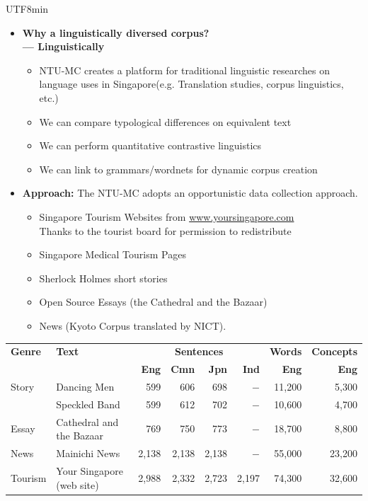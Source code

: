 \documentclass[25pt,landscape,headrule,footrule,dvips]{foils}
\newcommand{\emp}[1]{\textcolor{red}{#1}}
\newcommand{\myslide}[1]{\foilhead[-25mm]{\raisebox{12mm}[0mm]{\emp{#1}}}}
\begin{document}
\begin{CJK}{UTF8}{min}
\myslide{Motivation for NTU-MC}
\begin{itemize}\addtolength{\itemsep}{-0.8ex}
\item \textbf{Why a linguistically diversed corpus? \\--- Linguistically}
	\begin{itemize}
	\item NTU-MC creates a
          platform for traditional linguistic researches on language
          uses in Singapore(e.g. Translation studies, corpus
          linguistics, etc.)
        \item We can compare typological differences on equivalent text
        \item We can perform quantitative contrastive linguistics
        \item We can link to grammars/wordnets for dynamic corpus creation
	\end{itemize}
\end{itemize}

\myslide{Corpus Construction}
\begin{itemize}\addtolength{\itemsep}{-0.8ex}
\item \textbf{Approach:} The NTU-MC adopts an opportunistic data collection approach.
  \begin{itemize}
  \item Singapore Tourism Websites from \url{www.yoursingapore.com}
    \\ Thanks to the tourist board for permission to redistribute
  \item Singapore Medical Tourism Pages
  \item Sherlock Holmes short stories
  \item Open Source Essays (the Cathedral and the Bazaar)
  \item News (Kyoto Corpus translated by NICT).
  \end{itemize}
\end{itemize}

\myslide{NTU Multilingual Corpus}

{\footnotesize
\hspace{-15mm}
\begin{tabular}{llrrrrrr}\addtolength{\columnsep}{-1ex}
\textbf{Genre} &
\textbf{Text} &
\multicolumn{4}{c}{\textbf{Sentences}} 
& \textbf{Words} & \textbf{Concepts} \\
&& \textbf{Eng} &
\textbf{Cmn} &
\textbf{Jpn} &
\textbf{Ind} &
\textbf{Eng} &
\textbf{Eng} \\
\hline
Story &
Dancing Men &
599 &
606 &
698 &
$-$ &
11,200 & 
5,300 \\
~
 &
Speckled Band &
599 &
612 &
702 & 
$-$ &
10,600 &
4,700
\\
Essay &
Cathedral and the Bazaar &
769 &
750 &
773 &
$-$ & 
18,700 & 
8,800\\
News &
Mainichi News&
2,138 &
2,138 &
2,138 &
$-$ &
55,000 &
23,200\\
Tourism &
Your Singapore (web site)&
2,988 &
2,332 &
2,723 &
2,197 &
74,300 &
32,600  
\end{tabular}
}


\end{CJK}
\end{document}

